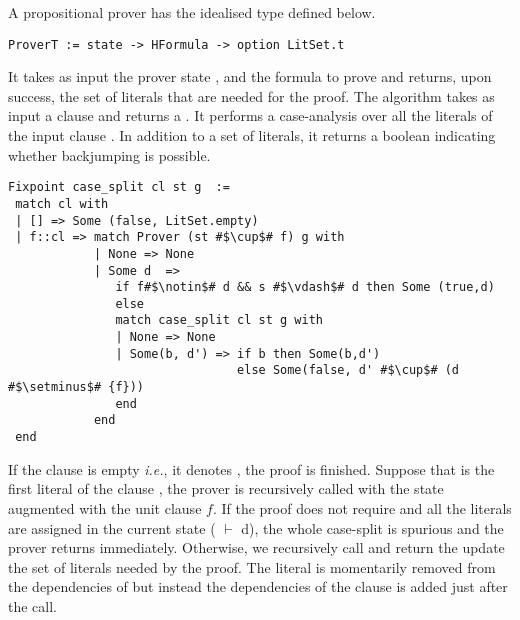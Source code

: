\documentclass[a4paper,UKenglish,cleveref, autoref, thm-restate]{lipics-v2019}
\begin{document}
%
A propositional prover has the idealised type  defined below.
\begin{verbatim}
ProverT := state -> HFormula -> option LitSet.t
\end{verbatim}
It takes as input the prover state , and the formula
to prove  and returns, upon success, %
the set of literals that are needed for the proof.
%
The  algorithm takes as input a clause  and
returns a .  It performs a case-analysis over all the
literals of the input clause . In addition to a set of
literals, it returns a boolean indicating whether backjumping is
possible.
\begin{verbatim}
Fixpoint case_split cl st g  :=
 match cl with
 | [] => Some (false, LitSet.empty)
 | f::cl => match Prover (st #$\cup$# f) g with
            | None => None
            | Some d  =>
               if f#$\notin$# d && s #$\vdash$# d then Some (true,d)
               else
               match case_split cl st g with
               | None => None
               | Some(b, d') => if b then Some(b,d')
                                else Some(false, d' #$\cup$# (d #$\setminus$# {f}))
               end
            end
 end
\end{verbatim}
If the clause is empty \emph{i.e.}, it denotes , the proof
is finished.  Suppose that  is the first literal of the clause
, the prover is recursively called with the state 
augmented with the unit clause $f$. If the proof  does not
require  and all the literals are assigned in the current
state ( $\vdash$ d), the whole case-split is spurious and the
prover returns immediately.  Otherwise, we recursively call
 and return the update the set of literals needed by the proof.
%
The literal  is momentarily removed from the dependencies of
 but instead the dependencies of the clause  is added
just after the  call.
\end{document}

